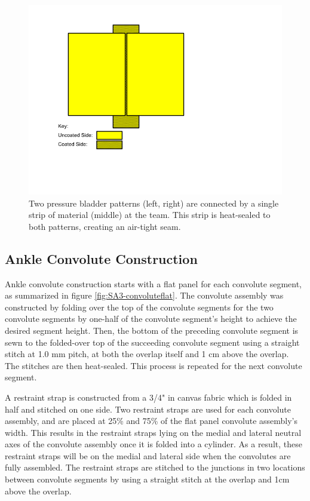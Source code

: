 \documentclass[defaultstyle,11pt]{comps}
\begin{document}
\begin{figure}
\hypertarget{fig:SA3-seam}{%
\centering
\includegraphics{../fig/SA3/BladderSeam.png}
\caption{Two pressure bladder patterns (left, right) are connected by a single strip of material (middle) at the team. This strip is heat-sealed to both patterns, creating an air-tight seam.}\label{fig:SA3-seam}
}
\end{figure}

\hypertarget{ankle-convolute-construction}{%
\subsection{Ankle Convolute Construction}\label{ankle-convolute-construction}}

Ankle convolute construction starts with a flat panel for each convolute segment, as summarized in figure \ref{fig:SA3-convoluteflat}.
The convolute assembly was constructed by folding over the top of the convolute segments for the two convolute segments by one-half of the convolute segment's height to achieve the desired segment height.
Then, the bottom of the preceding convolute segment is sewn to the folded-over top of the succeeding convolute segment using a straight stitch at 1.0 mm pitch, at both the overlap itself and 1 cm above the overlap.
The stitches are then heat-sealed.
This process is repeated for the next convolute segment.

A restraint strap is constructed from a 3/4" in canvas fabric which is folded in half and stitched on one side.
Two restraint straps are used for each convolute assembly, and are placed at 25\% and 75\% of the flat panel convolute assembly's width.
This results in the restraint straps lying on the medial and lateral neutral axes of the convolute assembly once it is folded into a cylinder.
As a result, these restraint straps will be on the medial and lateral side when the convolutes are fully assembled.
The restraint straps are stitched to the junctions in two locations between convolute segments by using a straight stitch at the overlap and 1cm above the overlap.
\end{document}
